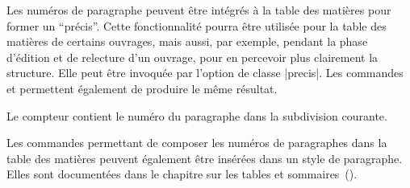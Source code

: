 Les numéros de paragraphe peuvent être intégrés à la table des matières pour former un \enquote{précis}. Cette fonctionnalité pourra être utilisée pour la table des matières de certains ouvrages, mais aussi, par exemple, pendant la phase d'édition et de relecture d'un ouvrage, pour en percevoir plus clairement la structure. Elle peut être invoquée par l'option de classe |precis|. Les commandes  et  permettent également de produire le même résultat.

\begin{noprint}
\newcommand{\precis}{\@precistrue}
\newcommand{\noprecis}{\@precisfalse}
\end{noprint}

\begin{developer}
Le compteur  contient le numéro du paragraphe dans la subdivision courante.
\end{developer}

\begin{noprint}
\setcounter{precis}{0}
\end{noprint}

Les commandes permettant de composer les numéros de paragraphes dans la table des matières peuvent également être insérées dans un style de paragraphe. Elles sont documentées dans le chapitre sur les tables et sommaires~(\pageref{tables-of-contents}).

\begin{noprint}
\newcommand{\cftparastyle}{\llap}
\newcommand{\cftparanumstyle}{\bfseries}
\newcommand{\cftparaaftersnum}{.\enskip}
\newcommand{\cftparanumsep}{,~}
\newcommand{\cftparaleader}{p.~}
\newcommand{\cftparaafterpnum}{.}
\newcommand{\cftparasep}{\par}
\end{noprint}

